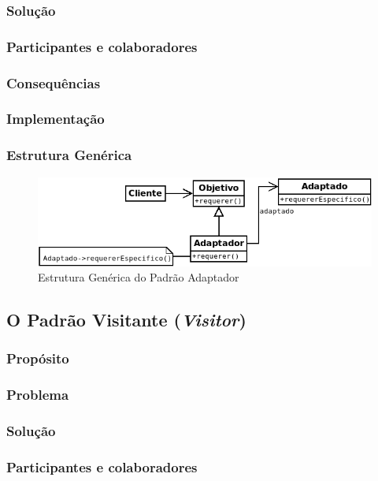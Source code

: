 \subsubsection{Solução}
\subsubsection{Participantes e colaboradores}
\subsubsection{Consequências}
\subsubsection{Implementação}
\subsubsection{Estrutura Genérica}

\begin{figure}[h]
\begin{center}
\includegraphics[scale=0.6]{adaptador.png}
\caption{Estrutura Genérica do Padrão Adaptador}\label{fig:adaptador}
\end{center}
\end{figure}

\subsection{O Padrão Visitante (\textit{Visitor})}
\subsubsection{Propósito}
\subsubsection{Problema}
\subsubsection{Solução}
\subsubsection{Participantes e colaboradores}
